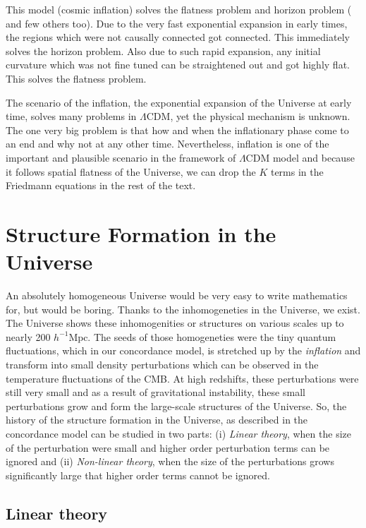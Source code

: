 This model (cosmic inflation) solves the flatness problem and horizon problem (
and few others too). Due to the very fast exponential expansion in early times, the
regions which were not causally connected got connected. This immediately solves
the horizon problem. Also due to such rapid expansion, any initial curvature which
was not fine tuned can be straightened out and got highly flat. This solves the
flatness problem. 

The scenario of the inflation, the exponential expansion of the Universe at 
early time, solves many problems in $\Lambda$CDM, yet the physical mechanism
is unknown. The one very big problem is that how and when the inflationary phase come
to an end and why not at any other time. Nevertheless, inflation is one of the
important and plausible scenario in the framework of $\Lambda$CDM model and because
it follows spatial flatness  of the Universe, we can drop the $K$ terms in the Friedmann
equations in the rest of the text.

\section{Structure Formation in the Universe}

An absolutely homogeneous Universe would be very easy to write mathematics for, but 
would be boring. Thanks to the inhomogeneties in the Universe, we exist. The Universe
shows these inhomogenities or structures on various scales up to nearly 
200 $h^{-1} \mathrm{Mpc}$. The seeds
of those homogeneties were the tiny quantum fluctuations, which in our concordance 
model, is stretched up by the {\it inflation} and transform into small density
perturbations which can be observed in the temperature fluctuations of the CMB. 
At high redshifts, these perturbations were still very small and as 
a result of gravitational instability, these small perturbations 
grow and form the large-scale structures of the Universe. 
So, the history of the  structure formation in the Universe, as described in the 
concordance model can be studied in two parts: (i) {\it Linear theory}, when
the size of the perturbation were small and higher order perturbation terms can be ignored and 
(ii) {\it Non-linear theory}, when the size of the perturbations grows significantly
large that higher order terms cannot be ignored.

\subsection{Linear theory}

